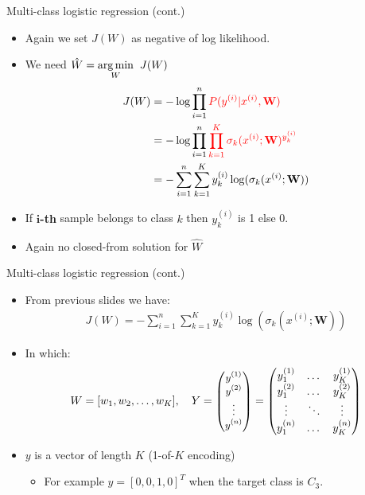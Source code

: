 \documentclass[serif, aspectratio=169]{beamer}
\begin{document}
\begin{frame}{Multi-class logistic regression (cont.)}
    \begin{itemize}
        \item Again we set $J(W)$ as negative of log likelihood.
        \item We need $\hat{W} = \underset{W}{\arg\min} \hspace{0.2cm} J(W)$
        \begin{align*}
            J(W) &= -\log \prod_{i=1}^{n} \textcolor{red}{P(y^{(i)}|x^{(i)}, \mathbf{W})} \\
            &= -\log \prod_{i=1}^{n}\textcolor{red}{\prod_{k=1}^{K}\sigma _k(x^{(i)}; \mathbf{W})^{y_k^{(i)}} }\\
            &= -\sum_{i=1}^{n}\sum_{k=1}^{K}y_k^{(i)} \log (\sigma _k(x^{(i)}; \mathbf{W}))
        \end{align*}
        \item If \textbf{$\textbf{i}$-th} sample belongs to class $k$ then $y^{(i)}_k$ is 1 else 0.
        \item Again no closed-from solution for $\hat{W}$
    \end{itemize}
    
\end{frame}
\begin{frame}{Multi-class logistic regression (cont.)}
    \begin{itemize}
        \item From previous slides we have:
            \begin{align*}
                J(W) = -\sum_{i=1}^{n}\sum_{k=1}^{K}y_k^{(i)} \log (\sigma _k(x^{(i)}; \mathbf{W}))
            \end{align*}
        \item In which:
             \[
        W = [w_1,w_2, \dots, w_K], \quad Y = 
        \text{\small $
        \begin{pmatrix}
            y^{(1)} \\
            y^{(2)} \\
            \vdots \\
            y^{(n)}
        \end{pmatrix}
        $}
        =
        \begin{pmatrix}
            y_1^{(1)} & \dots & y_K^{(1)} \\
            y_1^{(2)} & \dots & y_K^{(2)} \\
            \vdots    & \ddots & \vdots \\
            y_1^{(n)} & \dots & y_K^{(n)}
        \end{pmatrix}
    \]
    
        \item $y$ is a vector of length $K$ (1-of-$K$ encoding)
            \begin{itemize}
                \item For example $y=[0,0,1,0]^T$ when the target class is $C_3$.
            \end{itemize}
    \end{itemize}
\end{frame}
\end{document}
